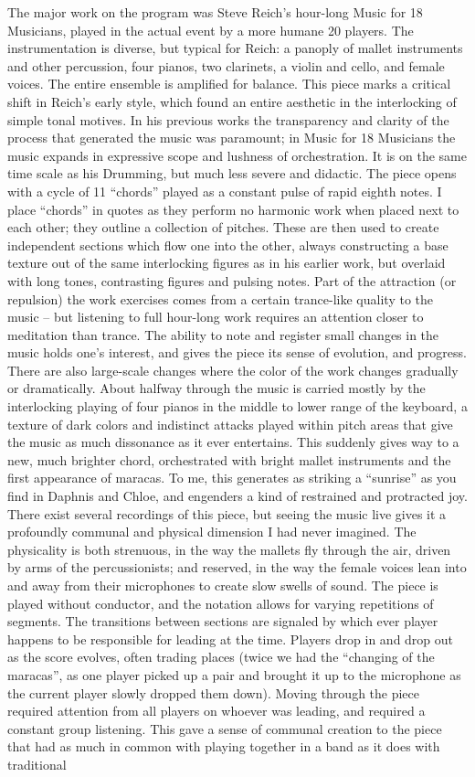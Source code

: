 The major work on the program was Steve Reich’s hour-long Music for 18 Musicians, played in the actual event by a more humane 20 players. The instrumentation is diverse, but typical for Reich: a panoply of mallet instruments and other percussion, four pianos, two clarinets, a violin and cello, and female voices. The entire ensemble is amplified for balance. This piece marks a critical shift in Reich’s early style, which found an entire aesthetic in the interlocking of simple tonal motives. In his previous works the transparency and clarity of the process that generated the music was paramount; in Music for 18 Musicians the music expands in expressive scope and lushness of orchestration. It is on the same time scale as his Drumming, but much less severe and didactic. The piece opens with a cycle of 11 “chords” played as a constant pulse of rapid eighth notes. I place “chords” in quotes as they perform no harmonic work when placed next to each other; they outline a collection of pitches. These are then used to create independent sections which flow one into the other, always constructing a base texture out of the same interlocking figures as in his earlier work, but overlaid with long tones, contrasting figures and pulsing notes. Part of the attraction (or repulsion) the work exercises comes from a certain trance-like quality to the music – but listening to full hour-long work requires an attention closer to meditation than trance. The ability to note and register small changes in the music holds one’s interest, and gives the piece its sense of evolution, and progress. There are also large-scale changes where the color of the work changes gradually or dramatically. About halfway through the music is carried mostly by the interlocking playing of four pianos in the middle to lower range of the keyboard, a texture of dark colors and indistinct attacks played within pitch areas that give the music as much dissonance as it ever entertains. This suddenly gives way to a new, much brighter chord, orchestrated with bright mallet instruments and the first appearance of maracas. To me, this generates as striking a “sunrise” as you find in Daphnis and Chloe, and engenders a kind of restrained and protracted joy. There exist several recordings of this piece, but seeing the music live gives it a profoundly communal and physical dimension I had never imagined. The physicality is both strenuous, in the way the mallets fly through the air, driven by arms of the percussionists; and reserved, in the way the female voices lean into and away from their microphones to create slow swells of sound. The piece is played without conductor, and the notation allows for varying repetitions of segments. The transitions between sections are signaled by which ever player happens to be responsible for leading at the time. Players drop in and drop out as the score evolves, often trading places (twice we had the “changing of the maracas”, as one player picked up a pair and brought it up to the microphone as the current player slowly dropped them down). Moving through the piece required attention from all players on whoever was leading, and required a constant group listening. This gave a sense of communal creation to the piece that had as much in common with playing together in a band as it does with traditional 